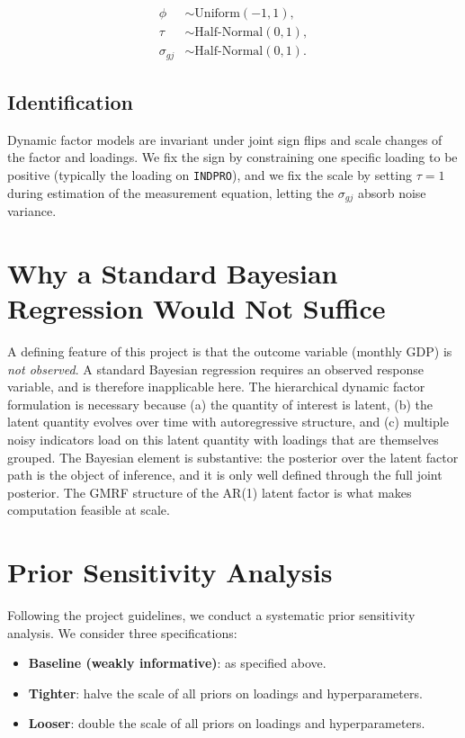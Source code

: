 \documentclass[11pt]{article}
\begin{document}
\begin{align}
\phi &\sim \text{Uniform}(-1, 1), \\
\tau &\sim \text{Half-Normal}(0, 1), \\
\sigma_{gj} &\sim \text{Half-Normal}(0, 1).
\end{align}

\subsection{Identification}

Dynamic factor models are invariant under joint sign flips and scale changes of the factor and loadings. We fix the sign by constraining one specific loading to be positive (typically the loading on \texttt{INDPRO}), and we fix the scale by setting $\tau = 1$ during estimation of the measurement equation, letting the $\sigma_{gj}$ absorb noise variance.

\section{Why a Standard Bayesian Regression Would Not Suffice}

A defining feature of this project is that the outcome variable (monthly GDP) is \emph{not observed}. A standard Bayesian regression requires an observed response variable, and is therefore inapplicable here. The hierarchical dynamic factor formulation is necessary because (a) the quantity of interest is latent, (b) the latent quantity evolves over time with autoregressive structure, and (c) multiple noisy indicators load on this latent quantity with loadings that are themselves grouped. The Bayesian element is substantive: the posterior over the latent factor path is the object of inference, and it is only well defined through the full joint posterior. The GMRF structure of the AR(1) latent factor is what makes computation feasible at scale.

\section{Prior Sensitivity Analysis}

Following the project guidelines, we conduct a systematic prior sensitivity analysis. We consider three specifications:
\begin{itemize}[nosep]
  \item \textbf{Baseline (weakly informative)}: as specified above.
  \item \textbf{Tighter}: halve the scale of all priors on loadings and hyperparameters.
  \item \textbf{Looser}: double the scale of all priors on loadings and hyperparameters.
\end{itemize}
\end{document}
